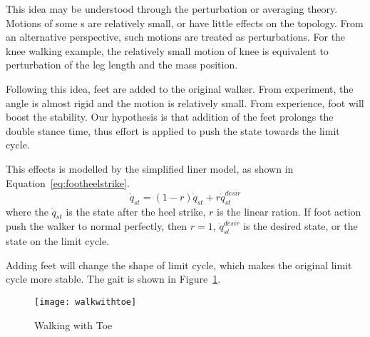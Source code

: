 {This idea may be understood through the perturbation or averaging theory\citep{khalil2002nonlinear}.
Motions of some {\dof}s are relatively small, or have little effects on the topology.
From an alternative perspective, such motions are treated as perturbations.
For the knee walking example, the relatively small motion of knee is equivalent to perturbation of the leg length and the mass position.



Following this idea, feet are added to the original walker.
From experiment, the angle is almost rigid and the motion is relatively small.
From experience, foot will boost the stability.
Our hypothesis is that addition of the feet prolongs the double stance time, thus effort is applied to push the state towards the limit cycle.

This effects is modelled by the simplified liner model, as shown in Equation~\ref{eq:footheelstrike}.
\begin{equation}
\label{eq:footheelstrike}
\dot{q}_{st}=(1-r)\dot{q}_{st}+r\dot{q}^{desir}_{st}
\end{equation}
where the $\dot{q}_{st}$ is the state after the heel strike,
$r$ is the linear ration.
If foot action push the walker to normal perfectly, then $r=1$,
$\dot{q}^{desir}_{st}$ is the desired state, or the state on the limit cycle.


Adding feet will change the shape of limit cycle, which makes the original limit cycle more stable.
The gait is shown in Figure~\ref{fig:ToeGait}.
\begin{figure}[!htbp]
  \begin{center}
      \texttt{[image: walkwithtoe]}
    \caption{Walking with Toe}
    \label{fig:ToeGait}
\end{center}
\end{figure}






}
